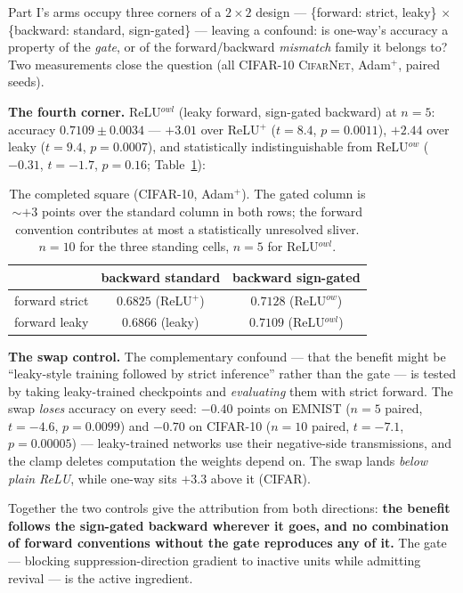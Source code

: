 \documentclass[11pt]{article}
\newcommand{\modelCifarNet}{\textsc{CifarNet}\xspace}
\begin{document}
Part I's arms occupy three corners of a $2\times2$ design ---
\{forward: strict, leaky\} $\times$ \{backward: standard,
sign-gated\} --- leaving a confound: is one-way's accuracy a
property of the \emph{gate}, or of the forward/backward
\emph{mismatch} family it belongs to? Two measurements close the
question (all CIFAR-10 \modelCifarNet{}, Adam$^{+}$, paired seeds).

\textbf{The fourth corner.} ReLU$^{\mathit{owl}}$ (leaky forward,
sign-gated backward) at $n{=}5$: accuracy $0.7109 \pm 0.0034$ ---
$+3.01$ over ReLU$^{+}$ ($t{=}8.4$, $p{=}0.0011$), $+2.44$ over
leaky ($t{=}9.4$, $p{=}0.0007$), and statistically indistinguishable
from ReLU$^{\mathit{ow}}$ ($-0.31$, $t{=}{-}1.7$, $p{=}0.16$;
Table~\ref{tab:square}):

\begin{table}[H]
\centering
\caption{The completed square (CIFAR-10, Adam$^{+}$). The gated
column is $\sim$$+3$ points over the standard column in both rows;
the forward convention contributes at most a statistically
unresolved sliver. $n{=}10$ for the three standing cells, $n{=}5$
for ReLU$^{\mathit{owl}}$.}
\label{tab:square}
\begin{tabular}{lcc}
\toprule
 & backward standard & backward sign-gated \\
\midrule
forward strict & $0.6825$ (ReLU$^{+}$) & $\mathbf{0.7128}$ (ReLU$^{\mathit{ow}}$) \\
forward leaky  & $0.6866$ (leaky)      & $\mathbf{0.7109}$ (ReLU$^{\mathit{owl}}$) \\
\bottomrule
\end{tabular}
\end{table}

\textbf{The swap control.} The complementary confound --- that the
benefit might be ``leaky-style training followed by strict
inference'' rather than the gate --- is tested by taking
leaky-trained checkpoints and \emph{evaluating} them with strict
forward. The swap \emph{loses} accuracy on every seed: $-0.40$
points on EMNIST ($n{=}5$ paired, $t{=}{-}4.6$, $p{=}0.0099$) and
$-0.70$ on CIFAR-10 ($n{=}10$ paired, $t{=}{-}7.1$,
$p{=}0.00005$) --- leaky-trained networks use their negative-side
transmissions, and the clamp deletes computation the weights depend
on. The swap lands \emph{below plain ReLU}, while one-way sits
$+3.3$ above it (CIFAR).

Together the two controls give the attribution from both directions:
\textbf{the benefit follows the sign-gated backward wherever it
goes, and no combination of forward conventions without the gate
reproduces any of it.} The gate --- blocking suppression-direction
gradient to inactive units while admitting revival --- is the active
ingredient.
\end{document}
